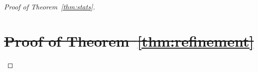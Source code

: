 \documentclass[lettersize,onecolumn,journal]{IEEEtran}
\theoremstyle{definition}
\theoremstyle{definition}
\newtheorem{defn}{Definition}
\def\fixme#1#2{\textbf{\color{red}[FIXME (#1): #2]}}
\providecommand{\DIFdeltex}[1]{{\protect\color{red}\sout{#1}}}                      %
\providecommand{\DIFdel}[1]{\texorpdfstring{\DIFdeltex{#1}}{}} %
\begin{document}
\begin{proof}[Proof of Theorem~\ref{thm:stats}]

\section*{\DIFdel{Proof of Theorem~\ref{thm:refinement}}}






\end{proof}
\end{document}
